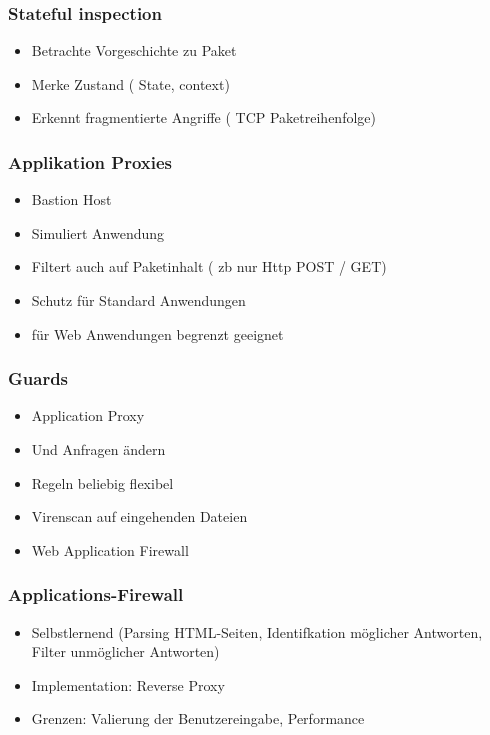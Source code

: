 \subsubsection*{ Stateful inspection }
\begin{itemize}
	\item Betrachte Vorgeschichte zu Paket
	\item Merke Zustand ( State, context)
	\item Erkennt fragmentierte Angriffe ( TCP Paketreihenfolge)
\end{itemize}

\subsubsection*{ Applikation Proxies }
\begin{itemize}
	\item Bastion Host
	\item Simuliert Anwendung
	\item Filtert auch auf Paketinhalt ( zb nur Http POST / GET)
	\item Schutz für Standard Anwendungen
	\item für Web Anwendungen begrenzt geeignet
\end{itemize}

\subsubsection*{ Guards }
\begin{itemize}
	\item Application Proxy
	\item Und Anfragen ändern
	\item Regeln beliebig flexibel
	\item Virenscan auf eingehenden Dateien
	\item Web Application Firewall
\end{itemize}

\subsubsection*{ Applications-Firewall }
\begin{itemize}
	\item Selbstlernend (Parsing HTML-Seiten, Identifkation möglicher Antworten, Filter unmöglicher Antworten)
	\item Implementation: Reverse Proxy 
	\item Grenzen: Valierung der Benutzereingabe, Performance
\end{itemize}

